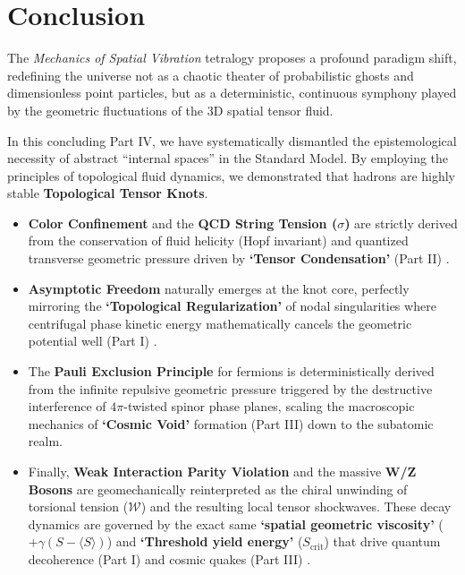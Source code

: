 \documentclass[reprint,amsmath,amssymb,aps,prd]{revtex4-2}
\begin{document}
\section{Conclusion}

The \textit{Mechanics of Spatial Vibration} tetralogy proposes a profound paradigm shift, redefining the universe not as a chaotic theater of probabilistic ghosts and dimensionless point particles, but as a deterministic, continuous symphony played by the geometric fluctuations of the 3D spatial tensor fluid.

In this concluding Part IV, we have systematically dismantled the epistemological necessity of abstract ``internal spaces'' in the Standard Model. By employing the principles of topological fluid dynamics, we demonstrated that hadrons are highly stable \textbf{Topological Tensor Knots}.

\begin{itemize}
    \item \textbf{Color Confinement} and the \textbf{QCD String Tension ($\sigma$)} are strictly derived from the conservation of fluid helicity (Hopf invariant) \cite{Moffatt1969} and quantized transverse geometric pressure driven by \textbf{`Tensor Condensation'} (Part II) \cite{YooPart2}.
    \item \textbf{Asymptotic Freedom} naturally emerges at the knot core, perfectly mirroring the \textbf{`Topological Regularization'} of nodal singularities where centrifugal phase kinetic energy mathematically cancels the geometric potential well (Part I) \cite{YooPart1, Gross1973}.
    \item The \textbf{Pauli Exclusion Principle} \cite{Pauli1925} for fermions is deterministically derived from the infinite repulsive geometric pressure triggered by the destructive interference of $4\pi$-twisted spinor phase planes, scaling the macroscopic mechanics of \textbf{`Cosmic Void'} formation (Part III) \cite{YooPart3} down to the subatomic realm.
    \item Finally, \textbf{Weak Interaction Parity Violation} \cite{Wu1957} and the massive \textbf{W/Z Bosons} are geomechanically reinterpreted as the chiral unwinding of torsional tension ($\mathcal{W}$) and the resulting local tensor shockwaves. These decay dynamics are governed by the exact same \textbf{`spatial geometric viscosity'} ($+\gamma(S - \langle S \rangle)$) and \textbf{`Threshold yield energy'} ($S_{\mathrm{crit}}$) that drive quantum decoherence (Part I) \cite{YooPart1} and cosmic quakes (Part III) \cite{YooPart3}.
\end{itemize}
\end{document}
